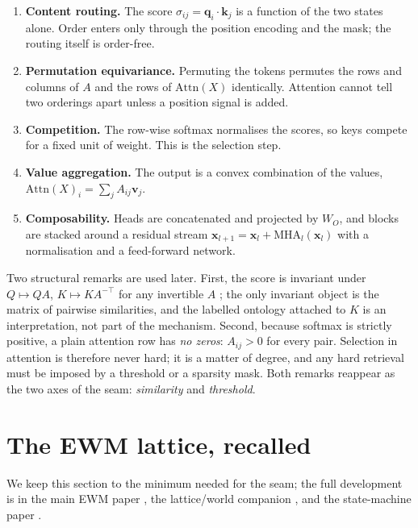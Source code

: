 \documentclass[11pt,a4paper]{article}
\theoremstyle{remark}
\newcommand{\Attn}{\ensuremath{\mathrm{Attn}}}          %
\newcommand{\q}{\ensuremath{\mathbf{q}}}                %
\renewcommand{\k}{\ensuremath{\mathbf{k}}}              %
\newcommand{\vv}{\ensuremath{\mathbf{v}}}               %
\newcommand{\xx}{\ensuremath{\mathbf{x}}}               %
\newcommand{\sigm}{\ensuremath{\sigma}}                 %
\begin{document}
\begin{enumerate}[leftmargin=*,nosep]
  \item \textbf{Content routing.} The score $\sigm_{ij}=\q_i\!\cdot\!\k_j$ is a
    function of the two states alone. Order enters only through the position
    encoding and the mask; the routing itself is order-free.
  \item \textbf{Permutation equivariance.} Permuting the tokens permutes the
    rows and columns of $A$ and the rows of $\Attn(X)$ identically. Attention
    cannot tell two orderings apart unless a position signal is added.
  \item \textbf{Competition.} The row-wise softmax normalises the scores, so
    keys compete for a fixed unit of weight. This is the selection step.
  \item \textbf{Value aggregation.} The output is a convex combination of the
    values, $\Attn(X)_i=\sum_j A_{ij}\vv_j$.
  \item \textbf{Composability.} Heads are concatenated and projected by $W_O$,
    and blocks are stacked around a residual stream
    $\xx_{l+1}=\xx_l+\mathrm{MHA}_l(\xx_l)$ with a normalisation and a
    feed-forward network.
\end{enumerate}

Two structural remarks are used later. First, the score is invariant under
$Q\mapsto QA$, $K\mapsto KA^{-\top}$ for any invertible $A$
\cite{cortex2026}; the only invariant object is the matrix of pairwise
similarities, and the labelled ontology attached to $K$ is an interpretation,
not part of the mechanism. Second, because softmax is strictly positive, a
plain attention row has \emph{no zeros}: $A_{ij}>0$ for every pair. Selection
in attention is therefore never hard; it is a matter of degree, and any
hard retrieval must be imposed by a threshold or a sparsity mask. Both remarks
reappear as the two axes of the seam: \emph{similarity} and
\emph{threshold}.

\section{The EWM lattice, recalled}
\label{sec:ewm-bg}

We keep this section to the minimum needed for the seam; the full development
is in the main EWM paper \cite{ewm2026}, the lattice/world companion
\cite{companion2026}, and the state-machine paper \cite{state2026}.
\end{document}
